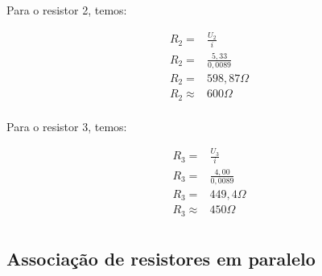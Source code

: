 Para o resistor 2, temos:

\begin{ceqn}
    \begin{align*}
        R_2 =& \frac{U_2}{i} \\
        R_2 =& \frac{5,33}{0,0089} \\
        R_2 =& 598,87\Omega \\
        R_2 \approx & 600 \Omega \\
    \end{align*}
\end{ceqn}

Para o resistor 3, temos:

\begin{ceqn}
    \begin{align*}
        R_3 =& \frac{U_3}{i} \\
        R_3 =& \frac{4,00}{0,0089} \\
        R_3 =& 449,4\Omega \\
        R_3 \approx & 450 \Omega \\
    \end{align*}
\end{ceqn}


\subsection{Associação de resistores em paralelo}











